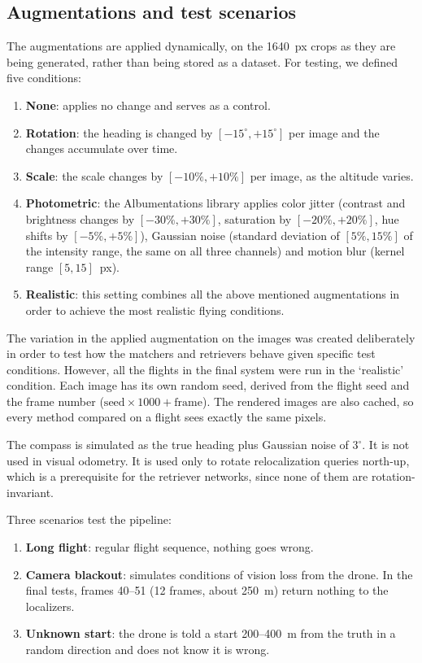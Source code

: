 \documentclass[english, Lau, oneside]{sapthesis}%
\begin{document}
\subsection{Augmentations and test scenarios}
\label{sec:augmentations}
The augmentations are applied dynamically, on the 1640~px crops as they are being generated, rather than being stored as a dataset. For testing, we defined five conditions:

\begin{enumerate}
\item \textbf{None}: applies no change and serves as a control.
\item \textbf{Rotation}: the heading is changed by $[-15^\circ, +15^\circ]$ per image and the changes accumulate over time.
\item \textbf{Scale}: the scale changes by $[-10\%, +10\%]$ per image, as the altitude varies.
\item \textbf{Photometric}: the Albumentations library \citep{buslaev2020albumentations} applies color jitter (contrast and brightness changes by $[-30\%, +30\%]$, saturation by $[-20\%, +20\%]$, hue shifts by $[-5\%, +5\%]$), Gaussian noise (standard deviation of $[5\%, 15\%]$ of the intensity range, the same on all three channels) and motion blur (kernel range $[5, 15]$~px).
\item \textbf{Realistic}: this setting combines all the above mentioned augmentations in order to achieve the most realistic flying conditions.
\end{enumerate}

The variation in the applied augmentation on the images was created deliberately in order to test how the matchers and retrievers behave given specific test conditions. However, all the flights in the final system were run in the `realistic' condition. Each image has its own random seed, derived from the flight seed and the frame number ($\text{seed} \times 1000 + \text{frame}$). The rendered images are also cached, so every method compared on a flight sees exactly the same pixels.

The compass is simulated as the true heading plus Gaussian noise of $3^\circ$. It is not used in visual odometry. It is used only to rotate relocalization queries north-up, which is a prerequisite for the retriever networks, since none of them are rotation-invariant.

Three scenarios test the pipeline:

\begin{enumerate}
\item \textbf{Long flight}: regular flight sequence, nothing goes wrong.
\item \textbf{Camera blackout}: simulates conditions of vision loss from the drone. In the final tests, frames 40--51 (12 frames, about 250~m) return nothing to the localizers.
\item \textbf{Unknown start}: the drone is told a start 200--400~m from the truth in a random direction and does not know it is wrong.
\end{enumerate}
\end{document}
